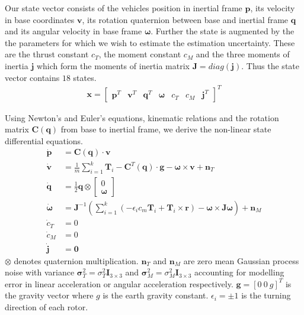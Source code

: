 \documentclass[10pt,a4paper]{article}
\begin{document}
Our state vector consists of the vehicles position in inertial frame $\mathbf{p}$, its velocity in base coordinates $\mathbf{v}$, its rotation quaternion between base and inertial frame $\mathbf{q}$ and its angular velocity in base frame $\boldsymbol{\omega}$. Further the state is augmented by the the parameters for which we wish to estimate the estimation uncertainty. These are the thrust constant $c_T$, the moment constant $c_M$ and the three moments of inertia $\mathbf{j}$ which form the moments of inertia matrix $\mathbf{J} = diag(\mathbf{j})$. Thus the state vector contains $18$ states.
\begin{align}
\mathbf{x} = \begin{bmatrix}
\mathbf{p}^T & \mathbf{v}^T & \mathbf{q}^T & \boldsymbol{\omega} & c_T & c_M & \mathbf{j}^T
\end{bmatrix} ^T
\end{align}

Using Newton's and Euler's equations, kinematic relations and the rotation matrix $\mathbf{C}(\mathbf{q})$ from base to inertial frame, we derive the non-linear state differential equations.
\begin{subequations}
\label{eq:model}
\begin{align}
\dot{\mathbf{p}} &= \mathbf{C}(\mathbf{q}) \cdot \mathbf{v} \\
\dot{\mathbf{v}} &= \frac{1}{m} \sum_{i=1}^k \mathbf{T}_i - \mathbf{C}^T(\mathbf{q}) \cdot \mathbf{g} - \boldsymbol{\omega} \times \mathbf{v} + \mathbf{n}_T \\
\dot{\mathbf{q}} &= \frac{1}{2} \mathbf{q} \otimes \begin{bmatrix}
0 \\ \boldsymbol{\omega}
\end{bmatrix} \\
\dot{\boldsymbol{\omega}} &= \mathbf{J}^{-1} \left(  \sum_{i=1}^k \left(-\epsilon_i  c_m \mathbf{T}_i + \mathbf{T}_i \times \mathbf{r} \right) - \boldsymbol{\omega} \times \mathbf{J} \boldsymbol{\omega} \right) + \mathbf{n}_M \\
\dot{c}_T &= 0 \\
\dot{c}_M &= 0 \\
\dot{\mathbf{j}} &= \mathbf{0}
\end{align}
\end{subequations}
$\otimes$ denotes quaternion multiplication. $\mathbf{n}_T$ and $\mathbf{n}_M$ are zero mean Gaussian process noise with variance $\boldsymbol{\sigma}_T^2 = \sigma_T^2 \mathbf{I}_{3\times3}$ and $\boldsymbol{\sigma}_M^2 = \sigma_M^2 \mathbf{I}_{3\times3}$ accounting for modelling error in linear acceleration or angular acceleration respectively. $\mathbf{g} = [0~0~g]^T$ is the gravity vector where $g$ is the earth gravity constant. $\epsilon_i = \pm 1$ is the turning direction of each rotor.
\end{document}
